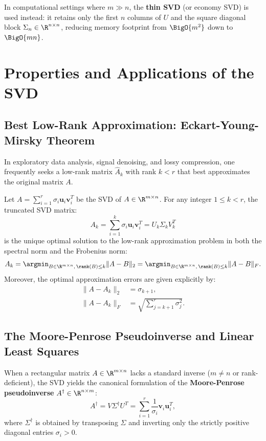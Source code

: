In computational settings where $m \gg n$, the \textbf{thin SVD} (or economy SVD) is used instead: it retains only the first $n$ columns of $U$ and the square diagonal block $\Sigma_n \in \R^{n \times n}$, reducing memory footprint from $\BigO{m^2}$ down to $\BigO{m n}$.

\FloatBarrier
\section{Properties and Applications of the SVD}

\subsection{Best Low-Rank Approximation: Eckart-Young-Mirsky Theorem}

In exploratory data analysis, signal denoising, and lossy compression, one frequently seeks a low-rank matrix $\hat{A}_k$ with rank $k < r$ that best approximates the original matrix $A$.

\begin{theorem}
Let $A = \sum_{i=1}^r \sigma_i \mathbf{u}_i \mathbf{v}_i^T$ be the SVD of $A \in \R^{m \times n}$. For any integer $1 \le k < r$, the truncated SVD matrix:
\begin{equation}
    A_k = \sum_{i=1}^k \sigma_i \mathbf{u}_i \mathbf{v}_i^T = U_k \Sigma_k V_k^T
\end{equation}
is the unique optimal solution to the low-rank approximation problem in both the spectral norm and the Frobenius norm:
\begin{equation}
    A_k = \argmin_{B \in \R^{m \times n},\, \rank(B) \le k} \|A - B\|_2 = \argmin_{B \in \R^{m \times n},\, \rank(B) \le k} \|A - B\|_F.
\end{equation}
Moreover, the optimal approximation errors are given explicitly by:
\begin{align}
    \|A - A_k\|_2 &= \sigma_{k+1}, \\
    \|A - A_k\|_F &= \sqrt{\sum_{j=k+1}^r \sigma_j^2}.
\end{align}
\end{theorem}

\subsection{The Moore-Penrose Pseudoinverse and Linear Least Squares}

When a rectangular matrix $A \in \R^{m \times n}$ lacks a standard inverse ($m \ne n$ or rank-deficient), the SVD yields the canonical formulation of the \textbf{Moore-Penrose pseudoinverse} $A^\dagger \in \R^{n \times m}$:
\begin{equation}
    A^\dagger = V \Sigma^\dagger U^T = \sum_{i=1}^r \frac{1}{\sigma_i} \mathbf{v}_i \mathbf{u}_i^T,
\end{equation}
where $\Sigma^\dagger$ is obtained by transposing $\Sigma$ and inverting only the strictly positive diagonal entries $\sigma_i > 0$.

